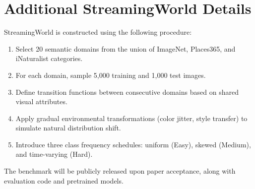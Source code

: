 \documentclass[11pt]{article}
\begin{document}
\section{Additional StreamingWorld Details}
\label{app:streaming}

StreamingWorld is constructed using the following procedure:
\begin{enumerate}
    \item Select 20 semantic domains from the union of ImageNet, Places365, and iNaturalist categories.
    \item For each domain, sample 5,000 training and 1,000 test images.
    \item Define transition functions between consecutive domains based on shared visual attributes.
    \item Apply gradual environmental transformations (color jitter, style transfer) to simulate natural distribution shift.
    \item Introduce three class frequency schedules: uniform (Easy), skewed (Medium), and time-varying (Hard).
\end{enumerate}

The benchmark will be publicly released upon paper acceptance, along with evaluation code and pretrained models.
\end{document}
